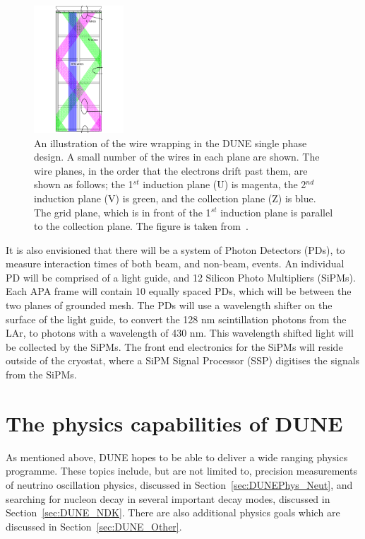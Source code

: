 \begin{figure}
  \centering
  \includegraphics[width=0.3\textwidth]{tpc_apa_cross_sections}
  \caption[An illustration of the wire wrapping in the DUNE single phase design]
          {An illustration of the wire wrapping in the DUNE single phase design. A small number of the wires in each plane are shown. The wire planes, in the order that the electrons drift past them, are shown as follows; the 1$^{st}$ induction plane (U) is magenta, the 2$^{nd}$ induction plane (V) is green, and the collection plane (Z) is blue. The grid plane, which is in front of the 1$^{st}$ induction plane is parallel to the collection plane. The figure is taken from~\citep{DUNECDR_V4}.}  
  \label{fig:FDWireWrap}
\end{figure}

It is also envisioned that there will be a system of Photon Detectors (PDs), to measure interaction times of both beam, and non-beam, events. An individual PD will be comprised of a light guide, and 12 Silicon Photo Multipliers (SiPMs). Each APA frame will contain 10 equally spaced PDs, which will be between the two planes of grounded mesh. The PDs will use a wavelength shifter on the surface of the light guide, to convert the 128 nm scintillation photons from the LAr, to photons with a wavelength of 430 nm. This wavelength shifted light will be collected by the SiPMs. The front end electronics for the SiPMs will reside outside of the cryostat, where a SiPM Signal Processor (SSP) digitises the signals from the SiPMs. \\

\section{The physics capabilities of DUNE} \label{sec:DUNEPhys}%
As mentioned above, DUNE hopes to be able to deliver a wide ranging physics programme. These topics include, but are not limited to, precision measurements of neutrino oscillation physics, discussed in Section~\ref{sec:DUNEPhys_Neut}, and searching for nucleon decay in several important decay modes, discussed in Section~\ref{sec:DUNE_NDK}. There are also additional physics goals which are discussed in Section~\ref{sec:DUNE_Other}. \\

